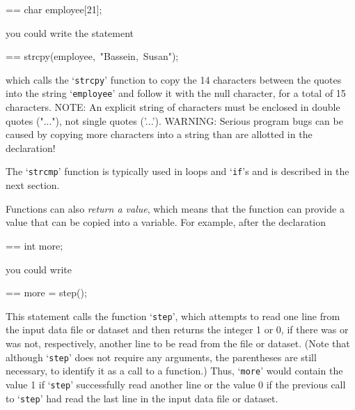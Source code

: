 \documentclass{book}
\makeatletter
\newenvironment{Texinfopreformatted}{%
  \par\GNUTobeylines\obeyspaces\frenchspacing\parskip=\z@\parindent=\z@}{}
{\catcode`\^^M=13 \gdef\GNUTobeylines{\catcode`\^^M=13 \def^^M{\null\par}}}
\newenvironment{Texinfoindented}{\begin{list}{}{}\item\relax}{\end{list}}
\renewcommand{\_}{\Texinfounderscore\discretionary{}{}{}}
\makeatother
\begin{document}
\begin{Texinfoindented}
\begin{Texinfopreformatted}%
\ttfamily char employee[21];
\end{Texinfopreformatted}
\end{Texinfoindented}
\noindent{}you could write the statement

\begin{Texinfoindented}
\begin{Texinfopreformatted}%
\ttfamily strcpy(employee,\ "Bassein,\ Susan");
\end{Texinfopreformatted}
\end{Texinfoindented}
\noindent{}which calls the `\texttt{strcpy}' function
to copy the 14 characters between the quotes into the
string `\texttt{employee}' and follow it with the null character, for a total
of 15 characters.
NOTE: An explicit string of characters must be enclosed in double quotes
%
("..."), not single quotes ('...').
WARNING: Serious program bugs
%
can be caused by copying more characters
into a string than are allotted in the declaration!

The `\texttt{strcmp}'
%
%
%
function is typically used in loops and
`\texttt{if}'s and is described in the next section.

Functions can also \textsl{return a value}, which means that the function
can provide a value that can be copied into a variable.
For example, after the declaration

\begin{Texinfoindented}
\begin{Texinfopreformatted}%
\ttfamily int more;
\end{Texinfopreformatted}
\end{Texinfoindented}
\noindent{}you could write

\begin{Texinfoindented}
\begin{Texinfopreformatted}%
\ttfamily more = step();
\end{Texinfopreformatted}
\end{Texinfoindented}

This statement calls the function `\texttt{step}',
which attempts to read one line from the input data file or
dataset and then returns the integer 1 or 0, if there was or was not,
respectively, another line to be read from the file or dataset. 
(Note that although `\texttt{step}' does not require any arguments, the
parentheses are still necessary, to identify it as a call to a function.)
Thus, `\texttt{more}' would contain the value 1 if `\texttt{step}' successfully read
another line or the value 0 if the previous call to `\texttt{step}' had read
the last line in the input data file or dataset.
\end{document}
